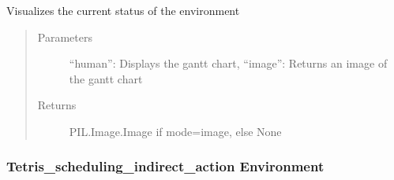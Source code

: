 \documentclass[letterpaper,10pt,english]{sphinxmanual}
\begin{document}
\begin{fulllineitems}
\begin{fulllineitems}
\label{\detokenize{environments:environments.env_tetris_scheduling.Env.render}}
\sphinxAtStartPar
Visualizes the current status of the environment
\begin{quote}\begin{description}
\item[{Parameters}] \leavevmode
\sphinxAtStartPar
{} \textendash{} “human”: Displays the gantt chart,
“image”: Returns an image of the gantt chart

\item[{Returns}] \leavevmode
\sphinxAtStartPar
PIL.Image.Image if mode=image, else None

\end{description}\end{quote}

\end{fulllineitems}


\end{fulllineitems}



\subsubsection{Tetris\_scheduling\_indirect\_action Environment}
\label{\detokenize{environments:module-environments.env_tetris_scheduling_indirect_action}}\label{\detokenize{environments:tetris-scheduling-indirect-action-environment}}
\end{document}
